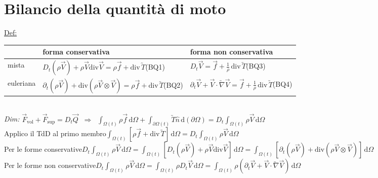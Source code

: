 \documentclass[11pt,a4paper]{report}
\newcommand{\de}{\mathrm d}
\begin{document}
	\section{Bilancio della quantità di moto}	\label{bq}
	\underline{Def:} \begin{tabularx}{\linewidth}{|l|X|X|}
	\hline
    &forma conservativa&forma non conservativa\\
    \hline
	mista&$D_t(\rho\vec V)+\rho\vec V\mathrm{div}\vec V=\rho\vec f+\mathrm{div}\,\utilde T$\quad\;\scriptsize{(BQ1)}&$D_t\vec V=\vec f+\frac 1\rho\,\mathrm{div}\,\utilde T$\quad\;\scriptsize{(BQ3)}\\
	euleriana&$\partial_t(\rho\vec V)+\mathrm{div}(\rho\vec V\!\otimes\!\vec V)=\rho\vec f+\mathrm{div}\,\utilde T$\quad\;\scriptsize{(BQ2)}&$\partial_t\vec V+\vec V\cdot\utilde\nabla\vec V=\vec f+\frac 1\rho\,\mathrm{div}\,\utilde T$\quad\;\scriptsize{(BQ4)}\\
	\hline
    \end{tabularx}\\
	\textit{Dim:} $\vec F_\mathrm{vol}+\vec F_\mathrm{sup}=D_t\vec Q\;\;\Rightarrow\;\;
	\int_{\Omega(t)}\rho\vec f\,\de \Omega
	+\int_{\partial\Omega(t)}\utilde T\hat n\,\mathrm  d(\partial\Omega)
	=D_t\int_{\Omega(t)}\rho\vec V\,\de \Omega$\\
	Applico il TdD al primo membro\quad$\int_{\Omega(t)}[\rho\vec f+\mathrm{div}\,\utilde T]\,\de \Omega
	=D_t\int_{\Omega(t)}\rho\vec V\,\de \Omega$\\
	Per le forme conservative\quad$D_t\int_{\Omega(t)}\rho\vec V\,\de \Omega
	=\int_{\Omega(t)}[D_t(\rho\vec V)+\rho\vec V\mathrm{div}\vec V]\,\de \Omega
	=\int_{\Omega(t)}[\partial_t(\rho\vec V)+\mathrm{div}(\rho\vec V\otimes\vec V)]\,\de \Omega$\\
	Per le forme non conservative\quad$D_t\int_{\Omega(t)}\rho\vec V\,\de \Omega
	=\int_{\Omega(t)}\rho D_t\vec V\,\de \Omega=\int_{\Omega(t)}\rho(\partial_t\vec V+\vec V\cdot\utilde\nabla\vec V)\,\de \Omega$
	 
\end{document}
